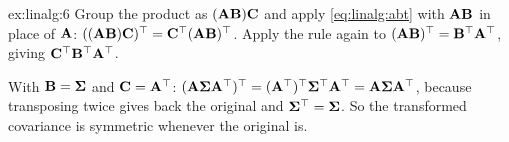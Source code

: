 \begin{solution}{ex:linalg:6}
Group the product as $(\mathbf{A}\mathbf{B})\mathbf{C}$ and apply \cref{eq:linalg:abt} with $\mathbf{A}\mathbf{B}$
in place of $\mathbf{A}$: $((\mathbf{A}\mathbf{B})\mathbf{C})^{\top} = \mathbf{C}^{\top}(\mathbf{A}\mathbf{B})^{\top}$. Apply the rule
again to $(\mathbf{A}\mathbf{B})^{\top} = \mathbf{B}^{\top}\mathbf{A}^{\top}$, giving $\mathbf{C}^{\top}\mathbf{B}^{\top}\mathbf{A}^{\top}$.

With $\mathbf{B} = \boldsymbol{\Sigma}$ and $\mathbf{C} = \mathbf{A}^{\top}$:
$(\mathbf{A}\boldsymbol{\Sigma}\mathbf{A}^{\top})^{\top} = (\mathbf{A}^{\top})^{\top}\boldsymbol{\Sigma}^{\top}\mathbf{A}^{\top} = \mathbf{A}\boldsymbol{\Sigma}\mathbf{A}^{\top}$, because
transposing twice gives back the original and $\boldsymbol{\Sigma}^{\top} = \boldsymbol{\Sigma}$. So the transformed covariance is
symmetric whenever the original is.
\end{solution}
